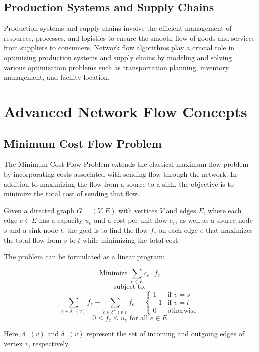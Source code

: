 \documentclass[12pt]{book} %
\begin{document}
\subsection{Production Systems and Supply Chains}
Production systems and supply chains involve the efficient management of resources, processes, and logistics to ensure the smooth flow of goods and services from suppliers to consumers. Network flow algorithms play a crucial role in optimizing production systems and supply chains by modeling and solving various optimization problems such as transportation planning, inventory management, and facility location.


\section{Advanced Network Flow Concepts}

\subsection{Minimum Cost Flow Problem}

The Minimum Cost Flow Problem extends the classical maximum flow problem by incorporating costs associated with sending flow through the network. In addition to maximizing the flow from a source to a sink, the objective is to minimize the total cost of sending that flow.

Given a directed graph \(G = (V, E)\) with vertices \(V\) and edges \(E\), where each edge \(e \in E\) has a capacity \(u_e\) and a cost per unit flow \(c_e\), as well as a source node \(s\) and a sink node \(t\), the goal is to find the flow \(f_e\) on each edge \(e\) that maximizes the total flow from \(s\) to \(t\) while minimizing the total cost.

The problem can be formulated as a linear program:

\[
\text{Minimize } \sum_{e \in E} c_e \cdot f_e
\]
\[
\text{subject to:}
\]
\[
\sum_{e \in \delta^-(v)} f_e - \sum_{e \in \delta^+(v)} f_e = 
\begin{cases} 
1 & \text{if } v = s \\
-1 & \text{if } v = t \\
0 & \text{otherwise}
\end{cases}
\]
\[
0 \leq f_e \leq u_e \text{ for all } e \in E
\]

Here, \(\delta^-(v)\) and \(\delta^+(v)\) represent the set of incoming and outgoing edges of vertex \(v\), respectively.
\end{document}
